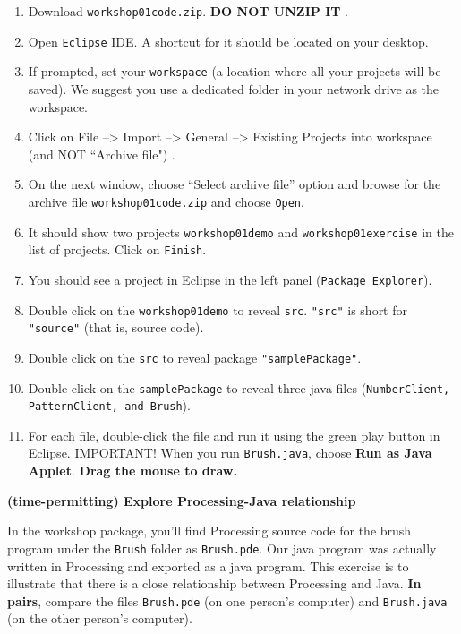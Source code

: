 \begin{questions}
\begin{enumerate}
\item Download \texttt{workshop01code.zip}. \textbf{\color{red} DO NOT UNZIP IT} \color{black}.
\item Open \texttt{Eclipse} IDE. A shortcut for it should be located on your desktop.
\item If prompted, set your \texttt{workspace} (a location where all your projects will be saved). We suggest you use a dedicated folder in your network drive as the workspace.
\item Click on \color{blue} File --> Import --> General --> Existing Projects into workspace \color{red} (and NOT ``Archive file") \color{black}.
\item On the next window, choose ``Select archive file'' option and browse for the archive file \texttt{workshop01code.zip} and choose \texttt{Open}.
\item It should show two projects \texttt{workshop01demo} and \texttt{workshop01exercise} in the list of projects. Click on \texttt{Finish}.
\item You should see a project in Eclipse in the left panel (\texttt{Package Explorer}).
\item Double click on the \texttt{workshop01demo} to reveal \texttt{src}. \texttt{"src"} is short for \texttt{"source"} (that is, source code).
\item Double click on the \texttt{src} to reveal package \texttt{"samplePackage"}.
\item Double click on the \texttt{samplePackage} to reveal three java files (\texttt{NumberClient, PatternClient, and Brush}). 
\item For each file, double-click the file and run it using the green play button in Eclipse. \color{red} IMPORTANT! \color{black} When you run \texttt{Brush.java}, choose \textbf{Run as Java Applet}. \textbf{Drag the mouse to draw.}
\end{enumerate}

\question \textbf{(time-permitting) Explore Processing-Java relationship} \vskip 0.5cm

In the workshop package, you'll find Processing source code for the brush program under the \texttt{Brush} folder as \texttt{Brush.pde}. Our java program was actually written in Processing and exported as a java program. This exercise is to illustrate that there is a close relationship between Processing and Java. \textbf{In pairs}, compare the files \texttt{Brush.pde} (on one person's computer) and \texttt{Brush.java} (on the other person's computer).


\end{questions}
